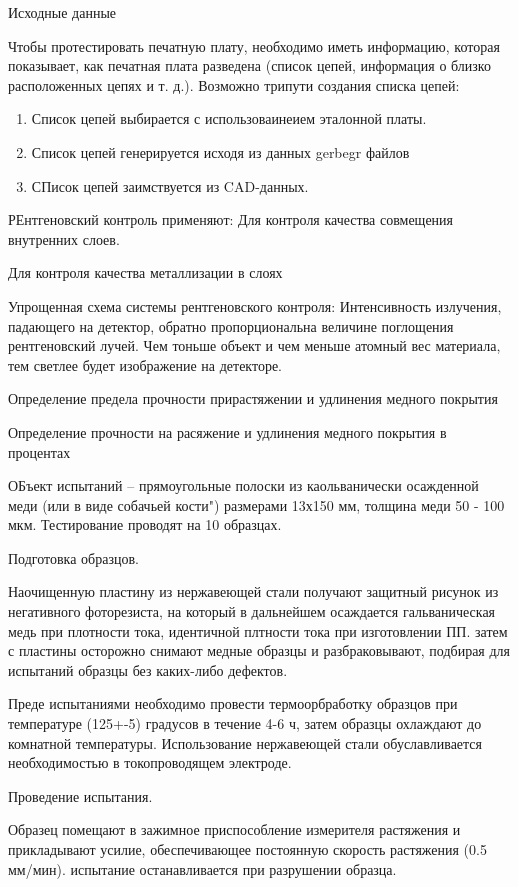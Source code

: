 \documentclass{article}
\begin{document}
Исходные данные

Чтобы протестировать печатную плату, необходимо иметь информацию, которая показывает, как печатная плата разведена (список цепей, информация о близко расположенных цепях и т. д.).
Возможно трипути создания списка цепей:
\begin{enumerate}
	\item Список цепей выбирается с использоваинеием эталонной платы.
	\item Список цепей генерируется исходя из данных gerbegr файлов
	\item СПисок цепей заимствуется из CAD-данных.

\end{enumerate}

РЕнтгеновский контроль применяют:
Для контроля качества совмещения внутренних слоев.

Для контроля качества металлизации в слоях

Упрощенная схема системы рентгеновского контроля:
Интенсивность излучения, падающего на детектор, обратно пропорциональна величине поглощения рентгеновский лучей. Чем тоньше объект и чем меньше атомный вес материала, тем светлее будет изображение на детекторе.

Определение предела прочности прирастяжении и удлинения медного покрытия

Определение прочности на расяжение и удлинения медного покрытия в процентах

ОБъект испытаний -- прямоугольные полоски из каольванически осажденной меди (или в виде собачьей кости") размерами 13х150 мм, толщина меди 50 - 100 мкм. Тестирование проводят на 10 образцах.

Подготовка образцов.

Наочищенную пластину из нержавеющей стали получают защитный рисунок из негативного фоторезиста, на который в дальнейшем осаждается гальваническая медь при плотности тока, идентичной плтности тока при изготовлении ПП. затем с пластины осторожно снимают медные образцы и разбраковывают, подбирая для испытаний образцы без каких-либо дефектов.

Преде испытаниями необходимо провести термоорбработку образцов при температуре (125+-5) градусов в течение 4-6 ч, затем образцы охлаждают до комнатной температуры. Использование нержавеющей стали обуславливается необходимостью в токопроводящем электроде.

Проведение испытания.

Образец помещают в зажимное приспособление измерителя растяжения и прикладывают усилие, обеспечивающее постоянную скорость растяжения (0.5 мм/мин). испытание останавливается при разрушении образца.
\end{document}
